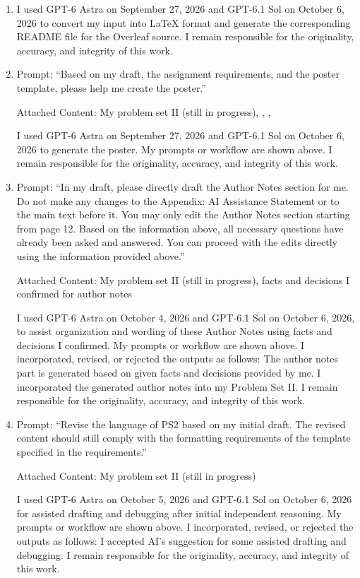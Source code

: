 \begin{enumerate}[label=\arabic*.,leftmargin=*,itemsep=2pt]
\item
I used GPT-6 Astra on September 27, 2026 and GPT-6.1 Sol on October 6, 2026 to convert my input into LaTeX format and generate the corresponding README file for the Overleaf source. I remain responsible for the originality, accuracy, and integrity of this work.

\item
Prompt: ``Based on my draft, the assignment requirements, and the poster template, please help me create the poster.''

Attached Content: My problem set II (still in progress), , , 

I used GPT-6 Astra on September 27, 2026 and GPT-6.1 Sol on October 6, 2026 to generate the poster. My prompts or workflow are shown above. I remain responsible for the originality, accuracy, and integrity of this work.

\item
Prompt: ``In my draft, please directly draft the Author Notes section for me. Do not make any changes to the Appendix: AI Assistance Statement or to the main text before it. You may only edit the Author Notes section starting from page 12. Based on the information above, all necessary questions have already been asked and answered. You can proceed with the edits directly using the information provided above.''

Attached Content: My problem set II (still in progress), facts and decisions I confirmed for author notes

I used GPT-6 Astra on October 4, 2026 and GPT-6.1 Sol on October 6, 2026, to assist organization and wording of these Author Notes using facts and decisions I confirmed. My prompts or workflow are shown above. I incorporated, revised, or rejected the outputs as follows: The author notes part is generated based on given facts and decisions provided by me. I incorporated the generated author notes into my Problem Set II. I remain responsible for the originality, accuracy, and integrity of this work.

\item
Prompt: ``Revise the language of PS2 based on my initial draft. The revised content should still comply with the formatting requirements of the template specified in the requirements.''

Attached Content: My problem set II (still in progress)

I used GPT-6 Astra on October 5, 2026 and GPT-6.1 Sol on October 6, 2026 for assisted drafting and debugging after initial independent reasoning. My prompts or workflow are shown above. I incorporated, revised, or rejected the outputs as follows: I accepted AI's suggestion for some assisted drafting and debugging. I remain responsible for the originality, accuracy, and integrity of this work.

\end{enumerate}

